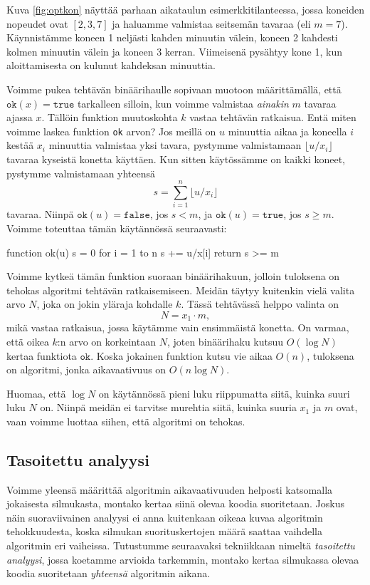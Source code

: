Kuva \ref{fig:optkon} näyttää parhaan aikataulun esimerkkitilanteessa,
jossa koneiden nopeudet ovat $[2,3,7]$ ja haluamme
valmistaa seitsemän tavaraa (eli $m=7$).
Käynnistämme koneen 1 neljästi kahden minuutin välein,
koneen 2 kahdesti kolmen minuutin välein ja koneen 3 kerran.
Viimeisenä pysähtyy kone 1, kun aloittamisesta
on kulunut kahdeksan minuuttia.

Voimme pukea tehtävän binäärihaulle sopivaan muotoon määrittämällä,
että $\texttt{ok}(x)=\texttt{true}$ tarkalleen silloin, kun voimme valmistaa
\emph{ainakin} $m$ tavaraa ajassa $x$.
Tällöin funktion muutoskohta $k$ vastaa tehtävän ratkaisua.
Entä miten voimme laskea funktion \texttt{ok} arvon?
Jos meillä on $u$ minuuttia aikaa ja koneella $i$ kestää $x_i$
minuuttia valmistaa yksi tavara, pystymme valmistamaan
$\lfloor u/x_i \rfloor$ tavaraa kyseistä konetta käyttäen.
Kun sitten käytössämme on kaikki koneet,
pystymme valmistamaan yhteensä
\[ s = \sum_{i=1}^n \lfloor u/x_i \rfloor \]
tavaraa. Niinpä $\texttt{ok}(u)=\texttt{false}$, jos $s<m$,
ja $\texttt{ok}(u)=\texttt{true}$, jos $s \ge m$.
Voimme toteuttaa tämän käytännössä seuraavasti:

\begin{code}
function ok(u)
    s = 0
    for i = 1 to n
        s += u/x[i]
    return s >= m
\end{code}

Voimme kytkeä tämän funktion suoraan binäärihakuun,
jolloin tuloksena on tehokas algoritmi tehtävän ratkaisemiseen.
Meidän täytyy kuitenkin vielä valita arvo $N$,
joka on jokin yläraja kohdalle $k$.
Tässä tehtävässä helppo valinta on
\[N = x_1 \cdot m,\]
mikä vastaa ratkaisua, jossa käytämme vain ensimmäistä konetta.
On varmaa, että oikea $k$:n arvo on korkeintaan $N$,
joten binäärihaku kutsuu $O(\log N)$ kertaa funktiota $\texttt{ok}$.
Koska jokainen funktion kutsu vie aikaa $O(n)$,
tuloksena on algoritmi, jonka aikavaativuus on $O(n \log N)$.

Huomaa, että $\log N$ on käytännössä pieni luku riippumatta
siitä, kuinka suuri luku $N$ on.
Niinpä meidän ei tarvitse murehtia siitä,
kuinka suuria $x_1$ ja $m$ ovat,
vaan voimme luottaa siihen, että algoritmi on tehokas.

\subsection{Tasoitettu analyysi}


Voimme yleensä määrittää algoritmin aikavaativuuden
helposti katsomalla jokaisesta silmukasta,
montako kertaa siinä olevaa koodia suoritetaan.
Joskus näin suoraviivainen analyysi ei anna kuitenkaan
oikeaa kuvaa algoritmin tehokkuudesta,
koska silmukan suorituskertojen määrä saattaa vaihdella
algoritmin eri vaiheissa.
Tutustumme seuraavaksi tekniikkaan nimeltä
\emph{tasoitettu analyysi}, jossa koetamme arvioida tarkemmin,
montako kertaa silmukassa olevaa koodia suoritetaan
\emph{yhteensä} algoritmin aikana.

